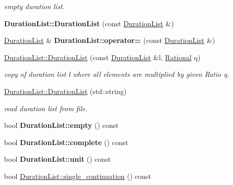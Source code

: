 \begin{DoxyCompactItemize}
\begin{DoxyCompactList}\small\item\em empty duration list. \end{DoxyCompactList}\item 
\mbox{\label{group__output_ga3dffe3684ea0f218d03ddcfd7ee783f8}} 
{\bfseries Duration\+List\+::\+Duration\+List} (const \mbox{\hyperlink{classDurationList}{Duration\+List}} \&)
\item 
\mbox{\label{group__output_ga831728f737383383f8f74580161eb3fb}} 
\mbox{\hyperlink{classDurationList}{Duration\+List}} \& {\bfseries Duration\+List\+::operator=} (const \mbox{\hyperlink{classDurationList}{Duration\+List}} \&)
\item 
\mbox{\hyperlink{group__output_ga95ba6b1b14592003fdc97b69f982677c}{Duration\+List\+::\+Duration\+List}} (const \mbox{\hyperlink{classDurationList}{Duration\+List}} \&l, \mbox{\hyperlink{classRational}{Rational}} q)
\begin{DoxyCompactList}\small\item\em copy of duration list l where all elements are multiplied by given Ratio q. \end{DoxyCompactList}\item 
\mbox{\hyperlink{group__output_gab678d41f41605596499c3f17a5f39120}{Duration\+List\+::\+Duration\+List}} (std\+::string)
\begin{DoxyCompactList}\small\item\em read duration list from file. \end{DoxyCompactList}\item 
\mbox{\label{group__output_ga293312eb9bbd4ac03d0add796c8eb12a}} 
bool {\bfseries Duration\+List\+::empty} () const
\item 
\mbox{\label{group__output_ga7fa2c8c9f2e3954592e4f0e264560e54}} 
bool {\bfseries Duration\+List\+::complete} () const
\item 
\mbox{\label{group__output_ga130ef44efbc7af3c3c9a6efa23639378}} 
bool {\bfseries Duration\+List\+::unit} () const
\item 
\mbox{\label{group__output_ga8b4434664a0dd2938fae9791fd34febd}} 
bool \mbox{\hyperlink{group__output_ga8b4434664a0dd2938fae9791fd34febd}{Duration\+List\+::single\+\_\+continuation}} () const

\end{DoxyCompactItemize}
